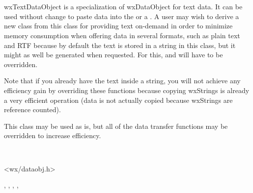 \section{}\label{wxtextdataobject}

wxTextDataObject is a specialization of wxDataObject for text data. It can be
used without change to paste data into the  
or a . A user may wish to derive a new
class from this class for providing text on-demand in order to minimize memory
consumption when offering data in several formats, such as plain text and RTF
because by default the text is stored in a string in this class, but it might
as well be generated when requested. For this, 
 and 
 will have to be overridden.

Note that if you already have the text inside a string, you will not achieve
any efficiency gain by overriding these functions because copying wxStrings is
already a very efficient operation (data is not actually copied because
wxStrings are reference counted).



This class may be used as is, but all of the data transfer functions may be
overridden to increase efficiency.


\\


<wx/dataobj.h>


, 
, 
, 
, 


\label{wxtextdataobjectwxtextdataobject}

